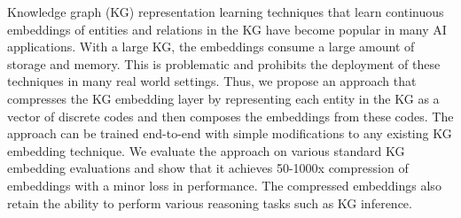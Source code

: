 Knowledge graph (KG) representation learning techniques that learn continuous embeddings of entities and relations in the KG have become popular in many AI applications. With a large KG, the embeddings consume a large amount of storage and memory. This is problematic and prohibits the deployment of these techniques in many real world settings. Thus, we propose an approach that compresses the KG embedding layer by representing each entity in the KG as a vector of discrete codes and then composes the embeddings from these codes. The approach can be trained end-to-end with simple modifications to any existing KG embedding technique. We evaluate the approach on various standard KG embedding evaluations and show that it achieves 50-1000x compression of embeddings with a minor loss in performance. The compressed embeddings also retain the ability to perform various reasoning tasks such as KG inference.
